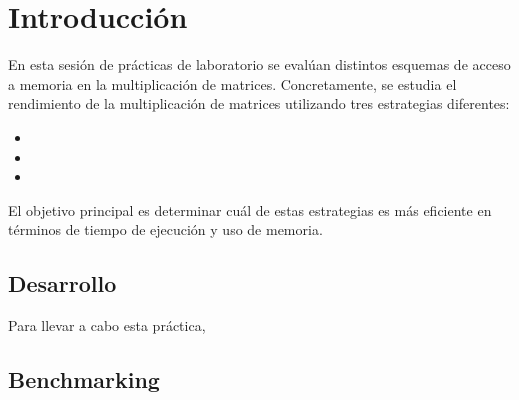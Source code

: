 \pagestyle{fancy}
\fancyhead[l]{\autorUO}
\fancyfoot[l]{\asignaturaAbbr}
\fancyfoot[r]{\fecha}

\section{Introducción}
En esta sesión de prácticas de laboratorio se evalúan distintos esquemas de acceso a memoria en la multiplicación de matrices.
Concretamente, se estudia el rendimiento de la multiplicación de matrices utilizando tres estrategias diferentes:

\begin{itemize}
    \item \rowmajor
    \item \colmajor
    \item \zorder
\end{itemize}
El objetivo principal es determinar cuál de estas estrategias es más eficiente en términos de tiempo de ejecución y uso de memoria.

\subsection{Desarrollo}
Para llevar a cabo esta práctica, 


\subsection{Benchmarking}
